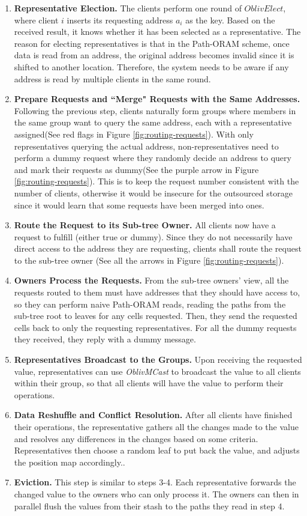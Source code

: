 \documentclass[fontsize=11pt]{article}
\begin{document}
\begin{enumerate}
    \item \textbf{Representative Election.} The clients perform one round of $OblivElect$, where client $i$ inserts its requesting address $a_i$ as the key. Based on the received result, it knows whether it has been selected as a representative. The reason for electing representatives is that in the Path-ORAM scheme, once data is read from an address, the original address becomes invalid since it is shifted to another location. Therefore, the system needs to be aware if any address is read by multiple clients in the same round.
    \item \textbf{Prepare Requests and ``Merge" Requests with the Same Addresses.} Following the previous step, clients naturally form groups where members in the same group want to query the same address, each with a representative assigned(See red flags in Figure \ref{fig:routing-requests}). With only representatives querying the actual address, non-representatives need to perform a dummy request where they randomly decide an address to query and mark their requests as dummy(See the purple arrow in Figure \ref{fig:routing-requests}). This is to keep the request number consistent with the number of clients, otherwise it would be insecure for the outsourced storage since it would learn that some requests have been merged into ones.
    \item \textbf{Route the Request to its Sub-tree Owner.} All clients now have a request to fulfill (either true or dummy). Since they do not necessarily have direct access to the address they are requesting, clients shall route the request to the sub-tree owner (See all the arrows in Figure \ref{fig:routing-requests}).
    \item \textbf{Owners Process the Requests.} From the sub-tree owners' view, all the requests routed to them must have addresses that they should have access to, so they can perform naive Path-ORAM reads, reading the paths from the sub-tree root to leaves for any cells requested. Then, they send the requested cells back to only the requesting representatives. For all the dummy requests they received, they reply with a dummy message.
    \item \textbf{Representatives Broadcast to the Groups.} Upon receiving the requested value, representatives can use \textit{OblivMCast} to broadcast the value to all clients within their group, so that all clients will have the value to perform their operations.
    \item \textbf{Data Reshuffle and Conflict Resolution.} After all clients have finished their operations, the representative gathers all the changes made to the value and resolves any differences in the changes based on some criteria. Representatives then choose a random leaf to put back the value, and adjusts the position map accordingly..
    \item \textbf{Eviction.} This step is similar to steps 3-4. Each representative forwards the changed value to the owners who can only process it. The owners can then in parallel flush the values from their stash to the paths they read in step 4.
\end{enumerate}
\end{document}

